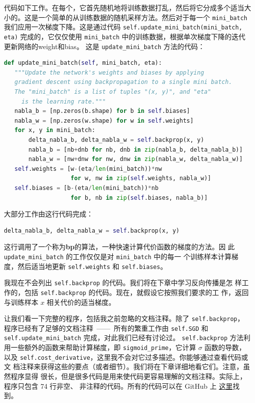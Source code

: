 代码如下工作。在每个\epoch{}，它首先随机地将训练数据打乱，然后将它分成多个适当大
小的\minibatch{}。这是一个简单的从训练数据的随机采样方法。然后对于每一个
\lstinline!mini_batch! 我们应用一次梯度下降。这是通过代码
\lstinline!self.update_mini_batch(mini_batch, eta)! 完成的，它仅仅使用
\lstinline!mini_batch! 中的训练数据，根据单次梯度下降的迭代更新网络的\gls*{weight}和\gls*{bias}。
这是 \lstinline!update_mini_batch! 方法的代码：
\begin{lstlisting}[language=Python]
def update_mini_batch(self, mini_batch, eta):
   """Update the network's weights and biases by applying
   gradient descent using backpropagation to a single mini batch.
   The "mini_batch" is a list of tuples "(x, y)", and "eta"
     is the learning rate."""
   nabla_b = [np.zeros(b.shape) for b in self.biases]
   nabla_w = [np.zeros(w.shape) for w in self.weights]
   for x, y in mini_batch:
       delta_nabla_b, delta_nabla_w = self.backprop(x, y)
       nabla_b = [nb+dnb for nb, dnb in zip(nabla_b, delta_nabla_b)]
       nabla_w = [nw+dnw for nw, dnw in zip(nabla_w, delta_nabla_w)]
   self.weights = [w-(eta/len(mini_batch))*nw
                   for w, nw in zip(self.weights, nabla_w)]
   self.biases = [b-(eta/len(mini_batch))*nb
                   for b, nb in zip(self.biases, nabla_b)]
\end{lstlisting}

大部分工作由这行代码完成：
\begin{lstlisting}[language=Python]
     delta_nabla_b, delta_nabla_w = self.backprop(x, y)
\end{lstlisting}

这行调用了一个称为\textbf{\gls{bp}}的算法，一种快速计算代价函数的梯度的方法。因
此 \lstinline!update_mini_batch! 的工作仅仅是对 \lstinline!mini_batch! 中的每一
个训练样本计算梯度，然后适当地更新 \lstinline!self.weights! 和
\lstinline!self.biases!。

我现在不会列出 \lstinline!self.backprop! 的代码。我们将在下章中学习反向传播是怎
样工作的，包括 \lstinline!self.backprop! 的代码。现在，就假设它按照我们要求的工
作，返回与训练样本 $x$ 相关代价的适当梯度。

让我们看一下完整的程序，包括我之前忽略的文档注释。除了 \lstinline!self.backprop!，
程序已经有了足够的文档注释~——~所有的繁重工作由 \lstinline!self.SGD! 和
\lstinline!self.update_mini_batch! 完成，对此我们已经有讨论过。
\lstinline!self.backprop! 方法利用一些额外的函数来帮助计算梯度，即
\lstinline!sigmoid_prime!，它计算 $\sigma$ 函数的导数，以及
\lstinline!self.cost_derivative!，这里我不会对它过多描述。你能够通过查看代码或文
档注释来获得这些的要点（或者细节）。我们将在下章详细地看它们。注意，虽然程序显得
很长，但是很多代码是用来使代码更容易理解的文档注释。实际上，程序只包含 74 行非空、
非注释的代码。所有的代码可以在 GitHub 上%
\href{https://github.com/mnielsen/neural-networks-and-deep-learning/blob/master/src/network.py}{
  这里}找到。

